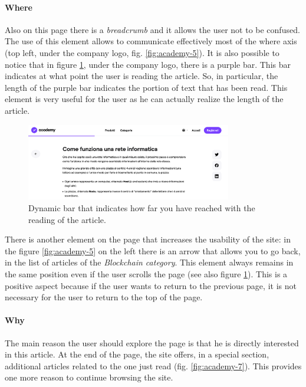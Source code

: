 \paragraph{Where}

Also on this page there is a \textit{breadcrumb} and it allows the user 
not to be confused. The use of this element allows to communicate 
effectively most of the where axis (top left, under the company logo, 
fig. \ref{fig:academy-5}). It is also possible to notice that in figure 
\ref{fig:academy-6}, under the company logo, there is a purple bar. This 
bar indicates at what point the user is reading the article. So, in 
particular, the length of the purple bar indicates the portion of text 
that has been read. This element is very useful for the user as he can 
actually realize the length of the article.

\begin{figure}[H]
  \centering
  \includegraphics[width=0.80\textwidth]{res/images/internal-pages/academy/academy-6.png}
  \caption{Dynamic bar that indicates how far you have reached with the 
  reading of the article.}
  \label{fig:academy-6}
\end{figure}

There is another element on the page that increases the usability of the 
site: in the figure \ref{fig:academy-5} on the left there is an arrow that 
allows you to go back, in the list of articles of the 
\textit{Blockchain category}. This element always remains in the same 
position even if the user scrolls the page (see also figure 
\ref{fig:academy-6}). This is a positive aspect because if the user wants 
to return to the previous page, it is not necessary for the user to return 
to the top of the page.

\paragraph{Why}

The main reason the user should explore the page is that he is directly 
interested in this article. At the end of the page, the site offers, in a 
special section, additional articles related to the one just read 
(fig. \ref{fig:academy-7}). This provides one more reason to continue 
browsing the site.


